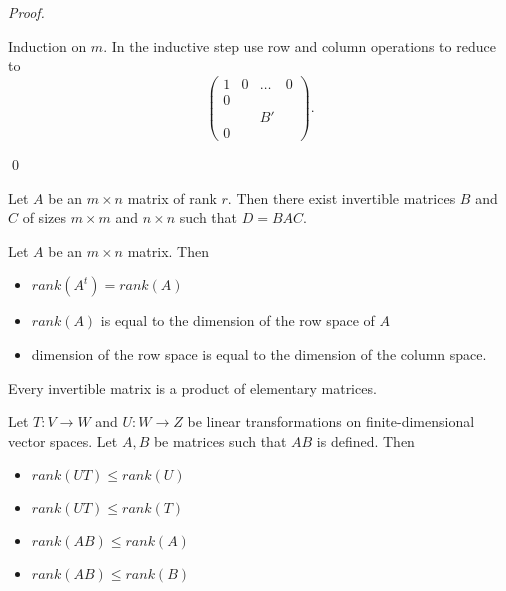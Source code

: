 \documentclass[12pt]{article}
\newenvironment{theorem}[2][Theorem]{\begin{trivlist}
\item[\hskip \labelsep {\bfseries #1}\hskip \labelsep {\bfseries #2.}]}{\end{trivlist}}
\newenvironment{corollary}[2][Corollary]{\begin{trivlist}
\item[\hskip \labelsep {\bfseries #1}\hskip \labelsep {\bfseries #2}]}{\end{trivlist}}
\newenvironment{sol}
    {\emph{Proof.}
    }
    {
    \qed
    }
\begin{document}
\begin{sol}
Induction on $m$. In the inductive step use row and column operations to reduce to
$$\left(\begin{array}{c|ccc}
1 & 0 & \ldots & 0 \\
\hline 
0 & & & \\
& & B' & \\
0 & & &
\end{array}\right).$$
\end{sol}

\begin{corollary}{7}
Let $A$ be an $m \times n$ matrix of rank $r$. Then there exist invertible matrices $B$ and $C$ of sizes $m \times m$ and $n \times n$ such that $D = BAC$. 
\end{corollary}

\begin{corollary}{8}
Let $A$ be an $m \times n$ matrix. Then 

\begin{itemize}
    \item $rank(A^t) = rank(A)$
    
    \item $rank(A)$ is equal to the dimension of the row space of $A$
    
    \item dimension of the row space is equal to the dimension of the column space.
\end{itemize}
\end{corollary}

\begin{corollary}{9}
Every invertible matrix is a product of elementary matrices.
\end{corollary}

\begin{theorem}{3.7}
Let $T : V \to W$ and $U : W \to Z$ be linear transformations on finite-dimensional vector spaces. Let $A, B$ be matrices such that $AB$ is defined. Then

\begin{itemize}
    \item[(a)] $rank(UT) \leq rank(U)$
    
    \item[(b)] $rank(UT) \leq rank(T)$
    
    \item[(c)] $rank(AB) \leq rank(A)$
    
    \item[(d)] $rank(AB) \leq rank(B)$
\end{itemize}
\end{theorem}
\end{document}
